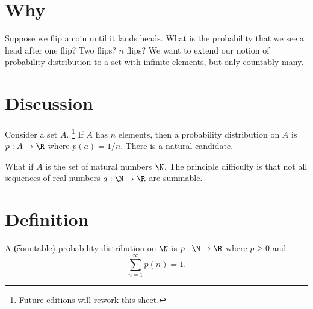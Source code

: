 
\section*{Why}

Suppose we flip a coin until it lands heads.
What is the probability that we see a head after one flip?
Two flips?
$n$ flips?
We want to extend our notion of probability distribution to a set with infinite elements, but only countably many.

\section*{Discussion}

Consider a set $A$.
  \ifhmode\unskip\fi\footnote{
Future editions will rework this sheet.
  }
If $A$ has $n$ elements, then a probability distribution on $A$ is $p: A \to \R $ where $p(a) = 1/n$.
There is a natural candidate.

What if $A$ is the set of natural numbers $\N $.
The principle difficulty is that not all sequences
of real numbers $a: \N  \to \R $ are summable.

\section*{Definition}

A \t{(countable) probability distribution} on $\N $ is $p: \N \to \R $ where $p \geq 0$ and
  \[
\textstyle
\sum_{n =1}^{\infty} p(n) = 1.
  \]

\blankpage
